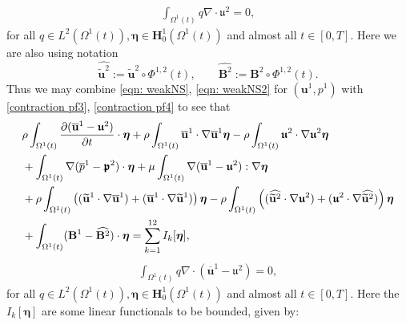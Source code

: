 \documentclass[a4paper]{amsart}
\numberwithin{equation}{section}
\newcommand{\ddt}[1]{\frac{\partial #1}{\partial t}}
\newcommand{\grad}{\nabla}
\newcommand{\Div}{\nabla \cdot}
\theoremstyle{plain}
\newcommand{\mbf}[1]{\mathbf{#1}}
\newcommand{\utwo}{\boldsymbol{\mathfrak{u}}^2}
\newcommand{\ptwo}{\boldsymbol{\mathfrak{p}}^2}
\begin{document}
    \begin{align}
        \int_{\Omega^1(t)} q \Div \utwo = 0, \label{contraction pf4}
    \end{align}
    for all $q \in L^2(\Omega^1(t)), \boldsymbol{\eta} \in \mbf{H}_0^1(\Omega^1(t))$ and almost all $t \in [0,T]$.
   Here we are also using notation
   \[ \widehat{\widetilde{\mbf{u}}^2} := \widetilde{\mbf{u}}^2 \circ \Phi^{1,2}(t), \qquad \widehat{\mbf{B}^2} := \mbf{B}^2 \circ \Phi^{1,2}(t). \]
   Thus we may combine \eqref{eqn: weakNS}, \eqref{eqn: weakNS2} for $(\mbf{u}^1, p^1)$ with \eqref{contraction pf3}, \eqref{contraction pf4} to see that
   \begin{align}
       &\rho \int_{\Omega^1(t)} \ddt{(\overline{\mbf{u}}^1 - \utwo)} \cdot \boldsymbol{\eta} + \rho \int_{\Omega^1(t)} \overline{\mbf{u}}^1 \cdot \grad\overline{\mbf{u}}^1 \boldsymbol{\eta} - \rho \int_{\Omega^1(t)} \utwo \cdot \grad \utwo \boldsymbol{\eta} \notag\\
       & + \int_{\Omega^1(t)} \grad(\overline{p}^1 - \ptwo) \cdot \boldsymbol{\eta} + \mu \int_{\Omega^1(t)} \grad (\overline{\mbf{u}}^1 - \utwo): \grad \boldsymbol{\eta} \label{contraction pf5}\\
       & + \rho \int_{\Omega^1(t)}  \left((\widetilde{\mbf{u}}^1 \cdot \grad \overline{\mbf{u}}^1) + (\overline{\mbf{u}}^1 \cdot \grad\widetilde{\mbf{u}}^1) \right)\boldsymbol{\eta} - \rho \int_{\Omega^1(t)}  \left((\widehat{\widetilde{\mbf{u}}^2} \cdot \grad \utwo) + (\utwo \cdot \grad\widehat{\widetilde{\mbf{u}}^2}) \right)\boldsymbol{\eta} \notag \\
       &+ \int_{\Omega^1(t)} (\mbf{B}^1 - \widehat{\mbf{B}^2}) \cdot \boldsymbol{\eta}= \sum_{k=1}^{12} I_k[\boldsymbol{\eta}], \notag
   \end{align}
   \begin{align}
   \int_{\Omega^1(t)} q \Div (\overline{\mbf{u}}^1 - \utwo) = 0, \label{contraction pf6}
   \end{align}
   for all $q \in L^2(\Omega^1(t)), \boldsymbol{\eta} \in \mbf{H}_0^1(\Omega^1(t))$ and almost all $t \in [0,T]$.
   Here the $I_k[\boldsymbol{\eta}]$ are some linear functionals to be bounded, given by:
\end{document}

